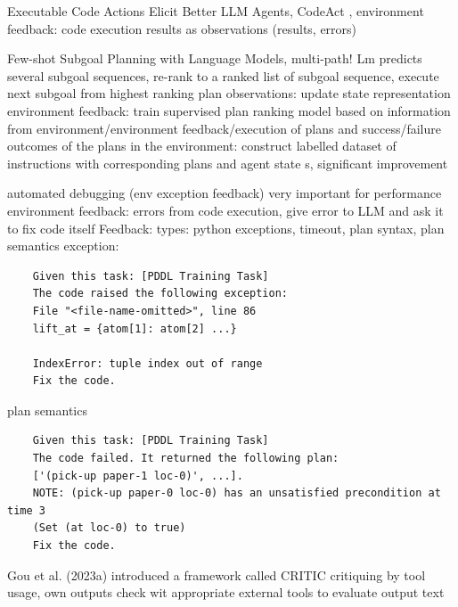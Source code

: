 \documentclass{article}
\begin{document}
\cite{wang_executable_2024} Executable Code Actions Elicit Better LLM Agents, CodeAct
, environment feedback: code execution results as observations (results, errors)

\cite{logeswaran_few-shot_2022} Few-shot Subgoal Planning with Language Models, multi-path!
Lm predicts several subgoal sequences, re-rank to a ranked list of subgoal sequence, execute next subgoal from highest ranking plan
observations: update state representation
environment feedback: train supervised plan ranking model based on information from environment/environment feedback/execution of plans and success/failure outcomes of the plans in the environment: construct labelled dataset of instructions with corresponding plans and agent state s, significant improvement

\cite{silver_generalized_2023}
automated debugging (env exception feedback) very important for performance
environment feedback: errors from code execution, give error to LLM and ask it to fix code itself
Feedback: types: python exceptions, timeout, plan syntax, plan semantics
exception:
\begin{verbatim}
	Given this task: [PDDL Training Task] 
	The code raised the following exception: 
	File "<file-name-omitted>", line 86 
	lift_at = {atom[1]: atom[2] ...}
	
	IndexError: tuple index out of range 
	Fix the code.
\end{verbatim}
plan semantics
\begin{verbatim}
	Given this task: [PDDL Training Task] 
	The code failed. It returned the following plan: 
	['(pick-up paper-1 loc-0)', ...]. 
	NOTE: (pick-up paper-0 loc-0) has an unsatisfied precondition at time 3 
	(Set (at loc-0) to true) 
	Fix the code.
\end{verbatim}

Gou et al. (2023a) introduced a framework called CRITIC
critiquing by tool usage, own outputs check wit appropriate external tools to evaluate output text
\end{document}
